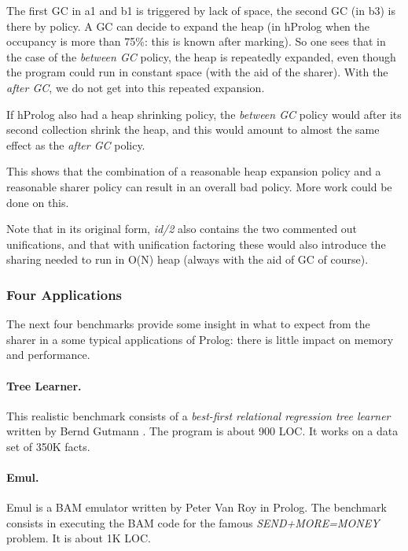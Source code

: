 \documentclass{tlp}
\begin{document}
The first GC in a1 and b1 is triggered by lack of space, the second GC
(in b3) is there by policy. A GC can decide to expand the heap (in
hProlog when the occupancy is more than 75\%: this is known after
marking). So one sees that in the case of the {\em between GC} policy,
the heap is repeatedly expanded, even though the program could run in
constant space (with the aid of the sharer). With the {\em after GC},
we do not get into this repeated expansion.

If hProlog also had a heap shrinking policy, the {\em between
GC} policy would after its second collection shrink the heap, and this
would amount to almost the same effect as the {\em after GC} policy.

This shows that the combination of a reasonable heap expansion policy
and a reasonable sharer policy can result in an overall bad policy.
More work could be done on this.

Note that in its original form, {\em id/2} also contains the two commented
out unifications, and that with unification factoring these would also
introduce the sharing needed to run in O(N) heap (always with the aid
of GC of course).

\subsubsection{Four Applications}

The next four benchmarks provide some insight in what to expect from
the sharer in a some typical applications of Prolog: there is little
impact on memory and performance.


\paragraph{Tree Learner.}

This realistic benchmark consists of a {\em best-first relational
regression tree learner} written by Bernd Gutmann \cite{Gutmann}. The
program is about 900 LOC. It works on a data set of 350K facts.


\paragraph{Emul.}

\begin{sloppypar}
Emul is a BAM emulator \cite{Aquarius} written by Peter Van Roy in
Prolog. The benchmark consists in executing the BAM code for the
famous {\em SEND+MORE=MONEY} problem. It is about 1K LOC. 
\end{sloppypar}
\end{document}
